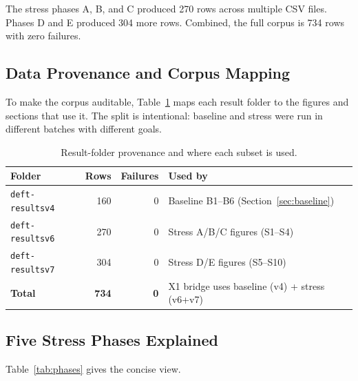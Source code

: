 \documentclass[10pt,twocolumn]{article}
\begin{document}
The stress phases A, B, and C produced 270 rows across multiple CSV files.
Phases D and E produced 304 more rows.
Combined, the full corpus is 734 rows with zero failures.

\subsection{Data Provenance and Corpus Mapping}

To make the corpus auditable, Table~\ref{tab:corpusmap} maps each result folder
to the figures and sections that use it.
The split is intentional: baseline and stress were run in different batches with
different goals.

\begin{table}[H]
\centering
\footnotesize
\caption{Result-folder provenance and where each subset is used.}
\label{tab:corpusmap}
\begin{tabular}{lrrp{3.2cm}}
\toprule
Folder & Rows & Failures & Used by \\
\midrule
\texttt{deft-resultsv4} & 160 & 0 & Baseline B1--B6 (Section~\ref{sec:baseline}) \\
\texttt{deft-resultsv6} & 270 & 0 & Stress A/B/C figures (S1--S4) \\
\texttt{deft-resultsv7} & 304 & 0 & Stress D/E figures (S5--S10) \\
\midrule
\textbf{Total} & \textbf{734} & \textbf{0} & X1 bridge uses baseline (v4) + stress (v6+v7) \\
\bottomrule
\end{tabular}
\end{table}

\subsection{Five Stress Phases Explained}

Table~\ref{tab:phases} gives the concise view.
\end{document}

